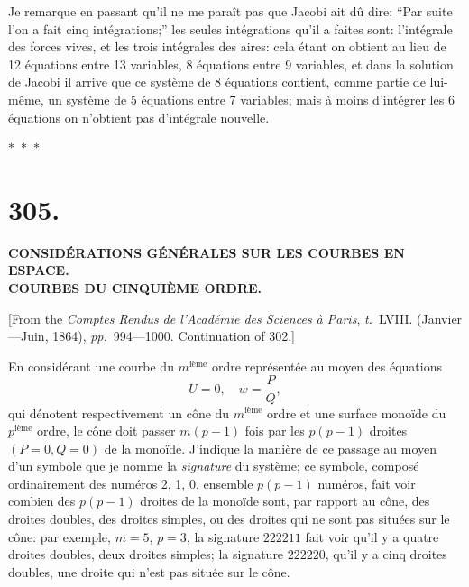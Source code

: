 \documentclass[11pt,a4paper]{article}
\newcommand{\tome}{\textit{t.}}
\newcommand{\pages}{\textit{pp.}}
\newcommand{\asterism}{\par\begin{center}$\ast$~$\ast$~$\ast$\end{center}\par}
\begin{document}
Je remarque en passant qu'il ne me para\^{i}t pas que Jacobi ait d\^{u} dire: ``Par suite l'on a fait cinq int\'{e}grations;'' les seules int\'{e}grations qu'il a faites sont: l'int\'{e}grale des forces vives, et les trois int\'{e}grales des aires: cela \'{e}tant on obtient au lieu de 12 \'{e}quations entre 13 variables, 8 \'{e}quations entre 9 variables, et dans la solution de Jacobi il arrive que ce syst\`{e}me de 8 \'{e}quations contient, comme partie de lui-m\^{e}me, un syst\`{e}me de 5 \'{e}quations entre 7 variables; mais \`{a} moins d'int\'{e}grer les 6 \'{e}quations on n'obtient pas d'int\'{e}grale nouvelle.

\asterism

\clearpage

\section*{305.}

\begin{center}
\textbf{CONSID\'{E}RATIONS G\'{E}N\'{E}RALES SUR LES COURBES EN ESPACE.}\\[0.5em]
\textbf{COURBES DU CINQUI\`{E}ME ORDRE.}
\end{center}

[From the \textit{Comptes Rendus de l'Acad\'{e}mie des Sciences \`{a} Paris}, \tome~LVIII. (Janvier---Juin, 1864), \pages~994---1000. Continuation of 302.]

\medskip

En consid\'{e}rant une courbe du $m^{\text{i\`{e}me}}$ ordre repr\'{e}sent\'{e}e au moyen des \'{e}quations
\[
U = 0, \quad w = \frac{P}{Q},
\]
qui d\'{e}notent respectivement un c\^{o}ne du $m^{\text{i\`{e}me}}$ ordre et une surface mono\"{i}de du $p^{\text{i\`{e}me}}$ ordre, le c\^{o}ne doit passer $m(p-1)$ fois par les $p(p-1)$ droites $(P = 0, Q = 0)$ de la mono\"{i}de. J'indique la mani\`{e}re de ce passage au moyen d'un symbole que je nomme la \textit{signature} du syst\`{e}me; ce symbole, compos\'{e} ordinairement des num\'{e}ros 2, 1, 0, ensemble $p(p-1)$ num\'{e}ros, fait voir combien des $p(p-1)$ droites de la mono\"{i}de sont, par rapport au c\^{o}ne, des droites doubles, des droites simples, ou des droites qui ne sont pas situ\'{e}es sur le c\^{o}ne: par exemple, $m = 5$, $p = 3$, la signature $222211$ fait voir qu'il y a quatre droites doubles, deux droites simples; la signature $222220$, qu'il y a cinq droites doubles, une droite qui n'est pas situ\'{e}e sur le c\^{o}ne.
\end{document}
